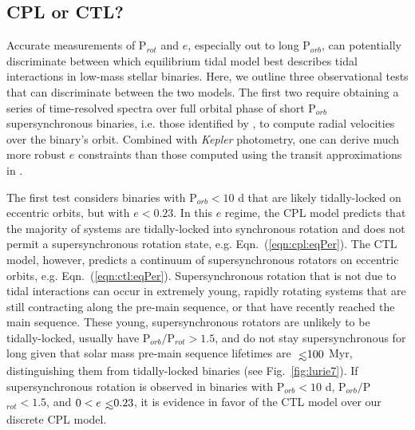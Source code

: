 \documentclass[twocolumn]{aastex61}
\def\lsim{~\rlap{$<$}{\lower 1.0ex\hbox{$\sim$}}}
\newcommand{\kepler}[0]{\textit{Kepler}\xspace}
\begin{document}

\subsection{CPL or CTL?} \label{sec:whichModel}

Accurate measurements of P$_{rot}$ and $e$, especially out to long P$_{orb}$, can potentially discriminate between which equilibrium tidal model best describes tidal interactions in low-mass stellar binaries. Here, we outline three observational tests that can discriminate between the two models.  The first two require obtaining a series of time-resolved spectra over full orbital phase of short P$_{orb}$ supersynchronous binaries, i.e. those identified by \citet{Lurie2017}, to compute radial velocities over the binary's orbit.  Combined with \kepler photometry, one can derive much more robust $e$ constraints than those computed using the transit approximations in \citet{Lurie2017}. 

The first test considers binaries with P$_{orb} < 10$ d that are likely tidally-locked on eccentric orbits, but with $e < 0.23$.  In this $e$ regime, the CPL model predicts that the majority of systems are tidally-locked into synchronous rotation and does not permit a supersynchronous rotation state, e.g. Eqn.~(\ref{eqn:cpl:eqPer}). The CTL model, however, predicts a continuum of supersynchronous rotators on eccentric orbits, e.g. Eqn.~(\ref{eqn:ctl:eqPer}). Supersynchronous rotation that is not due to tidal interactions can occur in extremely young, rapidly rotating systems that are still contracting along the pre-main sequence, or that have recently reached the main sequence.  These young, supersynchronous rotators are unlikely to be tidally-locked, usually have P$_{orb}/$P$_{rot} > 1.5$, and do not stay supersynchronous for long given that solar mass pre-main sequence lifetimes are $\lsim 100$ Myr, distinguishing them from tidally-locked binaries (see Fig.~\ref{fig:lurie7}).   If supersynchronous rotation is observed in binaries with P$_{orb} < 10$ d, P$_{orb}/$P$_{rot} < 1.5$, and $0 < e \lsim 0.23$, it is evidence in favor of the CTL model over our discrete CPL model. 
\end{document}
